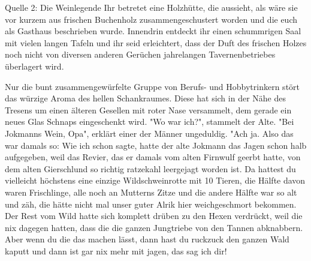 Quelle 2: Die Weinlegende
Ihr betretet eine Holzhütte, die aussieht, als wäre sie vor kurzem aus frischen Buchenholz zusammengeschustert worden und die euch als Gasthaus beschrieben wurde. Innendrin entdeckt ihr einen schummrigen Saal mit vielen langen Tafeln und ihr seid erleichtert, dass der Duft des frischen Holzes noch nicht von diversen anderen Gerüchen jahrelangen Tavernenbetriebes überlagert wird.

Nur die bunt zusammengewürfelte Gruppe von Berufs- und Hobbytrinkern stört das würzige Aroma des hellen Schankraumes. Diese hat sich in der Nähe des Tresens um einen älteren Gesellen mit roter Nase versammelt, dem gerade ein neues Glas Schnaps eingeschenkt wird. "Wo war ich?", stammelt der Alte. "Bei Jokmanns Wein, Opa", erklärt einer der Männer ungeduldig. "Ach ja. Also das war damals so: Wie ich schon sagte, hatte der alte Jokmann das Jagen schon halb aufgegeben, weil das Revier, das er damals vom alten Firnwulf geerbt hatte, von dem alten Gierschlund so richtig ratzekahl leergejagt worden ist. Da hattest du vielleicht höchstens eine einzige Wildschweinrotte mit 10 Tieren, die Hälfte davon waren Frischlinge, alle noch an Mutterns Zitze und die andere Hälfte war so alt und zäh, die hätte nicht mal unser guter Alrik hier weichgeschmort bekommen.
Der Rest vom Wild hatte sich komplett drüben zu den Hexen verdrückt, weil die nix dagegen hatten, dass die die ganzen Jungtriebe von den Tannen abknabbern. Aber wenn du die das machen lässt, dann hast du ruckzuck den ganzen Wald kaputt und dann ist gar nix mehr mit jagen, das sag ich dir!

